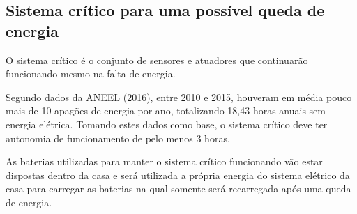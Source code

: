 \subsection{Sistema crítico para uma possível queda de energia}
\par O sistema crítico é o conjunto de sensores e atuadores que continuarão funcionando mesmo na falta de energia.
\par Segundo dados da ANEEL (2016), entre 2010 e 2015, houveram em média pouco mais de 10 apagões de energia por ano, totalizando 18,43 horas anuais sem energia elétrica. Tomando estes dados como base, o sistema crítico deve ter autonomia de funcionamento de pelo menos 3 horas.
\par As baterias utilizadas para manter o sistema crítico funcionando vão estar dispostas dentro da casa e será utilizada a própria energia do sistema elétrico da casa para carregar as baterias na qual somente será recarregada após uma queda de energia. 
